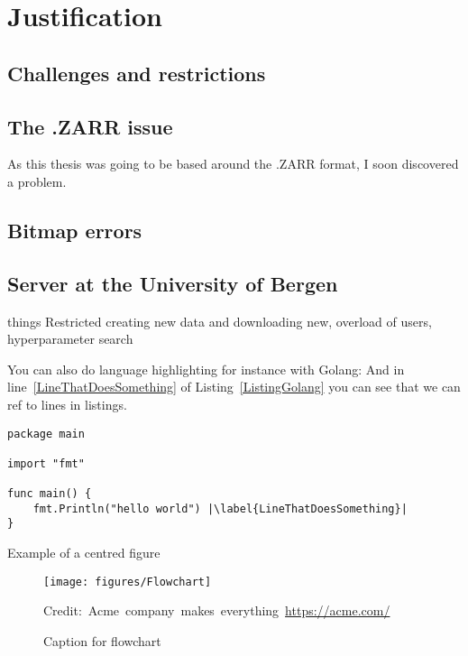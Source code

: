 \section{Justification}
    
    \subsection{Challenges and restrictions}
    \subsection{The .ZARR issue}
        As this thesis was going to be based around the .ZARR format, I soon discovered a problem. 
    \subsection{Bitmap errors} \label{bitmap_error}
        
        
    \subsection{Server at the University of Bergen}
        things
        Restricted creating new data and downloading new, overload of users, hyperparameter search

You can also do language highlighting for instance with Golang:
And in line~\ref{LineThatDoesSomething} of Listing~\ref{ListingGolang} you can see that we can ref to lines in listings.

\begin{lstlisting}[caption={Hello world in Golang},label=ListingGolang,escapechar=|]
package main

import "fmt"

func main() {
    fmt.Println("hello world") |\label{LineThatDoesSomething}|
}

\end{lstlisting}



Example of a centred figure
\begin{figure}[H]
    \centering
    \texttt{[image: figures/Flowchart]}
    \caption{Caption for flowchart}
  	\medskip 
	\hspace*{15pt}\hbox{\scriptsize Credit: Acme company makes everything \url{https://acme.com/}}
    \label{FlowchartFigure}
\end{figure}



